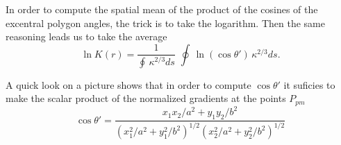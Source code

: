 \documentclass[11pt]{article}
\begin{document}
In order to compute the spatial mean of the product of the cosines of the excentral polygon angles,  the trick is to take the logarithm.
Then the same  reasoning leads us to take the average 
   \begin{equation} \label{task1}      \ln K(r) =   \frac{ 1}{\oint \,  \kappa^{2/3}  ds} \,  \, \oint \,  \ln( \cos \theta')\,  \kappa^{2/3} ds  .
            \end{equation}

A quick look  on  a picture shows that in order to compute $\cos \theta'$ it suficies to make the scalar product of the normalized gradients
at the points $ P_{pm}$
\begin{equation}
          \cos \theta'  =   \frac{x_1 x_2/a^2 + y_1 y_2/b^2 }{  ( x_1^2/a^2 + y_1^2/b^2 )^{1/2}   ( x_2^2/a^2 + y_2^2/b^2 )^{1/2}  }
        \end{equation}  
          
\end{document}
